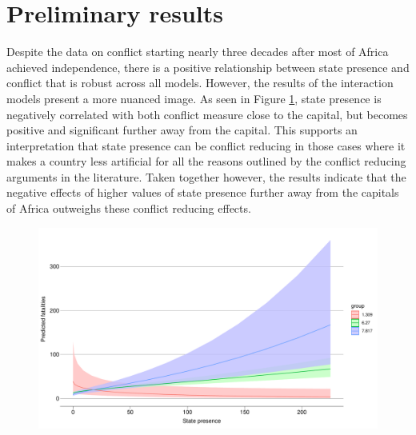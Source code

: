 \documentclass[12pt]{article}
\begin{document}
\section{Preliminary results}

Despite the data on conflict starting nearly three decades after most of Africa
achieved independence, there is a positive relationship between state presence
and conflict that is robust across all models. However, the results of the interaction
models present a more nuanced image. As seen in Figure \ref{deaths_int},
state presence is negatively correlated with both conflict measure close to the
capital, but becomes positive and significant further away from the capital.
This supports an interpretation that state presence can be conflict reducing in
those cases where it makes a country less artificial for all the reasons
outlined by the conflict reducing arguments in the literature. Taken together
however, the results indicate that the negative effects of higher values of
state presence further away from the capitals of Africa outweighs these conflict
reducing effects. 


\begin{figure}[htpb]
	\centering
	\includegraphics[width=\linewidth]{"../R/Output/deathsIntPlot.pdf"}
	\caption{}
	\label{deaths_int}
\end{figure}


\end{document}
